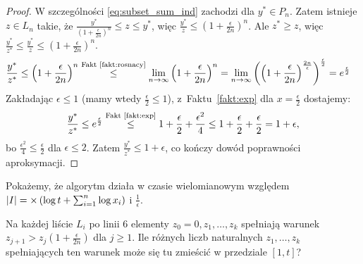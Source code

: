 \begin{proof}
	W szczególności \eqref{eq:subset_sum_ind} zachodzi dla $y^* \in P_n$. Zatem istnieje $z \in L_n$ takie, że $\frac{y^*}{\left(1+\frac{\epsilon}{2n}\right)^n} \le z \le y^*$, więc $\frac{y^*}{z} \le \left(1+\frac{\epsilon}{2n}\right)^n$.
	Ale $z^* \ge z$, więc $\frac{y^*}{z^*} \le \frac{y^*}{z} \le \left(1+\frac{\epsilon}{2n}\right)^n$.
	\begin{align*}
		\frac{y^*}{z^*} & \le \left(1+\frac{\epsilon}{2n}\right)^n \overset{\text{Fakt~\ref{fakt:rosnacy}}}{\le} \lim_{n\to\infty} \left(1+\frac{\epsilon}{2n}\right)^n = \lim_{n\to\infty} \left(\left(1+\frac{\epsilon}{2n}\right)^{\frac{2n}{\epsilon}}\right)^{\frac{\epsilon}{2}} = e^{\frac{\epsilon}{2}}
	\end{align*}
	Zakładając $\epsilon \le 1$ (mamy wtedy $\frac{\epsilon}{2} \le 1$), z~Faktu~\ref{fakt:exp} dla $x = \frac{\epsilon}{2}$ dostajemy:
	\begin{align*}
		\frac{y^*}{z^*} \le e^{\frac{\epsilon}{2}} \overset{\text{Fakt~\ref{fakt:exp}}}{\le} 1 + \frac{\epsilon}{2} + \frac{\epsilon^2}{4} \le 1 + \frac{\epsilon}{2} + \frac{\epsilon}{2} = 1 + \epsilon,
	\end{align*}
	bo $\frac{\epsilon^2}{4} \le \frac{\epsilon}{2}$ dla $\epsilon \le 2$. Zatem $\frac{y^*}{z^*} \le 1 + \epsilon$, co kończy dowód poprawności aproksymacji.
\end{proof}

Pokażemy, że algorytm działa w czasie wielomianowym względem $|I| = \mathcal{\Theta}\left(\log t + \sum_{i=1}^n \log x_i\right)$ i $\frac{1}{\epsilon}$.

Na każdej liście $L_i$ po linii 6 elementy $z_0=0, z_1, \dots, z_k$ spełniają warunek $z_{j+1} > z_j\left(1 + \frac{\epsilon}{2n}\right)$ dla $j \ge 1$.
Ile różnych liczb naturalnych $z_1, \dots, z_k$ spełniających ten warunek może się tu zmieścić w przedziale $[1, t]$?

